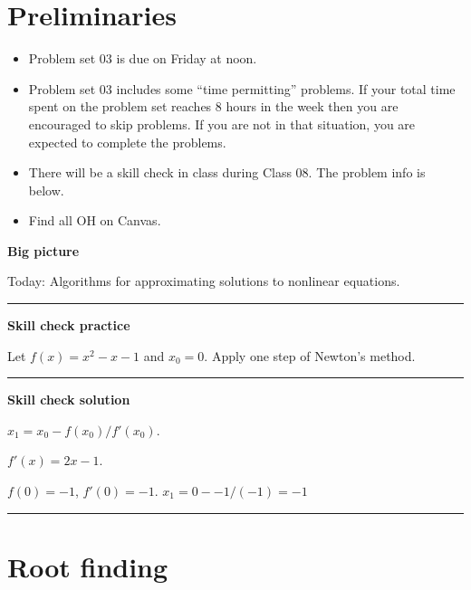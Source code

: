 \documentclass[12pt,letterpaper,noanswers]{exam}
\begin{document}
 \pdfpageheight 11in 
  \pdfpagewidth 8.5in

\noindent 

\section*{Preliminaries}

\begin{itemize}
\itemsep0pt
\item Problem set 03 is due on Friday at noon.
\item Problem set 03 includes some ``time permitting'' problems.  If your total time spent on the problem set reaches 8 hours in the week then you are encouraged to skip problems.  If you are not in that situation, you are expected to complete the problems.
\item There will be a skill check in class during Class 08.  The problem info is below.
\item Find all OH on Canvas.
\end{itemize}



\noindent\textbf{Big picture}

Today: Algorithms for approximating solutions to nonlinear equations.

\vspace{0.2cm}
\hrule
\vspace{0.2cm}

\noindent \textbf{Skill check practice}
\begin{questions}
\item Let $f(x) = x^2 -x -1$ and $x_0 = 0$.  Apply one step of Newton's method.
\end{questions}


\vspace{0.2cm}
\hrule
\vspace{0.2cm}

\noindent \textbf{Skill check solution}
\begin{questions}
\item $x_1 = x_0 - f(x_0)/f'(x_0)$.  

$f'(x) = 2x - 1$.

$f(0) = -1$, $f'(0) = -1$.  $x_1 = 0 - -1/(-1) = -1$

\end{questions}
\vspace{0.2cm}
\hrule
\vspace{0.2cm}


\section*{Root finding}
\end{document}
